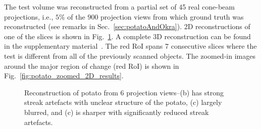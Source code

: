 \documentclass[journal]{IEEEtran}
\begin{document}
The test volume was reconstructed from a partial set of 45 real
cone-beam projections, i.e., $5\%$ of the $900$ projection views from
which ground truth was reconstructed (see remarks in
Sec.~\ref{sec:potatoAndOkra}). 2D reconstructions of one of the slices
is shown in Fig.~\ref{fig:potato_2D_results}. A complete 3D
reconstruction can be found in the supplementary
material~\cite{supp_paper}. The red RoI spans 7 consecutive slices
where the test is different from all of the previously scanned
objects. The zoomed-in images around the major region of change (red
RoI) is shown in Fig.~\ref{fig:potato_zoomed_2D_results}. 
\begin{figure}[!h]
\centering
{}
\caption{Reconstruction of potato from 6 projection views--(b) has strong streak artefacts with unclear structure of the potato, (c) largely blurred, and (c) is sharper with significantly reduced streak artefacts.}
\label{fig:potato_2D_results}
\end{figure}
\end{document}
